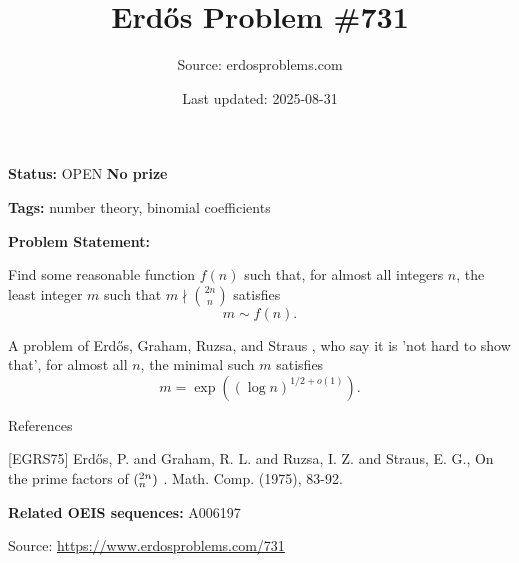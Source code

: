 \documentclass{article}
\title{Erd\H{o}s Problem \#731}
\date{Last updated: 2025-08-31}
\author{Source: erdosproblems.com}
\begin{document}
\maketitle

\noindent\textbf{Status:} OPEN \quad \textbf{No prize}

\noindent\textbf{Tags:} number theory, binomial coefficients

\medskip

\noindent\textbf{Problem Statement:}

Find some reasonable function $f(n)$ such that, for almost all integers $n$, the least integer $m$ such that $m\nmid \binom{2n}{n}$ satisfies\[m\sim f(n).\]




A problem of Erd\H{o}s, Graham, Ruzsa, and Straus \cite{EGRS75}, who say it is 'not hard to show that', for almost all $n$, the minimal such $m$ satisfies\[m=\exp((\log n)^{1/2+o(1)}).\]




References

[EGRS75] Erd\H{o}s, P. and Graham, R. L. and Ruzsa, I. Z. and Straus, E. G., On the prime factors of $(\sp{2n}\sb{n})$ . Math. Comp. (1975), 83-92.

\noindent\textbf{Related OEIS sequences:} A006197


\bigskip
\noindent\small{Source: \url{https://www.erdosproblems.com/731}}
\end{document}
